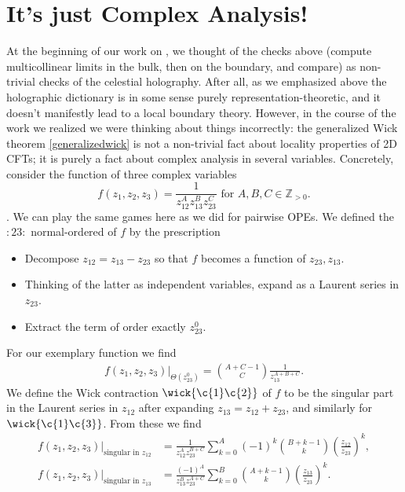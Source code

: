 \documentclass[11pt,letterpaper]{article}
\begin{document}
\section{It's just Complex Analysis!}
At the beginning of our work on \cite{Calkins:2026hpg}, we thought of the checks above (compute multicollinear limits in the bulk, then on the boundary, and compare) as non-trivial checks of the celestial holography. After all, as we emphasized above the holographic dictionary is in some sense purely representation-theoretic, and it doesn't manifestly lead to a local boundary theory. However, in the course of the work we realized we were thinking about things incorrectly: the generalized Wick theorem \eqref{generalizedwick} is not a non-trivial fact about locality properties of 2D CFTs; it is purely a fact about complex analysis in several variables. Concretely, consider the function of three complex variables \begin{equation}
f(z_1, z_2, z_3) = \frac{1}{z_{12}^A z_{13}^B z_{23}^C} \mbox{ for } A,B,C \in \mathbb{Z}_{>0}.
\end{equation}. 
We can play the same games here as we did for pairwise OPEs. We defined the $:23:$ normal-ordered of $f$ by the prescription \begin{itemize}
    \item Decompose $z_{12} = z_{13} - z_{23}$ so that $f$ becomes a function of $z_{23}, z_{13}$.
    \item Thinking of the latter as independent variables, expand as a Laurent series in $z_{23}$.
    \item Extract the term of order exactly $z_{23}^0$. 
\end{itemize}
For our exemplary function we find  \begin{equation} \label{f-normal-23}
    \begin{split}
        f(z_1, z_2, z_3) \Big|_{\Theta(z_{23}^0)}
            ={A+C-1 \choose C}\frac{1}{z_{13}^{A+B+C}}.
    \end{split}
\end{equation}
We define the Wick contraction $\wick{ \c {1} \c {2} }$ of $f$ to be the singular part in the Laurent series in $z_{12}$ after expanding $z_{13} = z_{12} + z_{23}$, and similarly for $\wick{ \c {1} \c {3} }$. From these we find \begin{equation}
    \begin{split}
        f(z_1, z_2, z_3)\Big|_{\text{singular in }z_{12}} &= \frac{1}{z_{12}^A z_{23}^{B+C}} \sum_{k=0}^{A} (-1)^k {B+k-1 \choose k} \left(\frac{z_{12}}{z_{23}}\right)^k  , \\
        f(z_1, z_2, z_3)\Big|_{\text{singular in }z_{13}} &= \frac{(-1)^A}{z_{13}^B z_{23}^{A+C}} \sum_{k=0}^{B} {A+k-1 \choose k} \left(\frac{z_{13}}{z_{23}}\right)^k .
    \end{split}
\end{equation}
\end{document}
